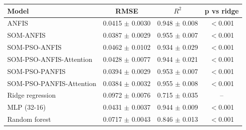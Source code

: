 \begin{tabular}{lccc}
\hline
Model & RMSE & $R^2$ & p vs ridge \\
\hline
ANFIS & 0.0415 $\pm$ 0.0030 & 0.948 $\pm$ 0.008 & $<$0.001 \\
SOM-ANFIS & 0.0387 $\pm$ 0.0029 & 0.955 $\pm$ 0.007 & $<$0.001 \\
SOM-PSO-ANFIS & 0.0462 $\pm$ 0.0102 & 0.934 $\pm$ 0.029 & $<$0.001 \\
SOM-PSO-ANFIS-Attention & 0.0428 $\pm$ 0.0077 & 0.944 $\pm$ 0.021 & $<$0.001 \\
SOM-PSO-PANFIS & 0.0394 $\pm$ 0.0029 & 0.953 $\pm$ 0.007 & $<$0.001 \\
SOM-PSO-PANFIS-Attention & 0.0384 $\pm$ 0.0032 & 0.955 $\pm$ 0.008 & $<$0.001 \\
\hline
Ridge regression & 0.0972 $\pm$ 0.0076 & 0.715 $\pm$ 0.035 & -- \\
MLP (32-16) & 0.0431 $\pm$ 0.0037 & 0.944 $\pm$ 0.009 & $<$0.001 \\
Random forest & 0.0717 $\pm$ 0.0043 & 0.846 $\pm$ 0.013 & $<$0.001 \\
\hline
\end{tabular}
